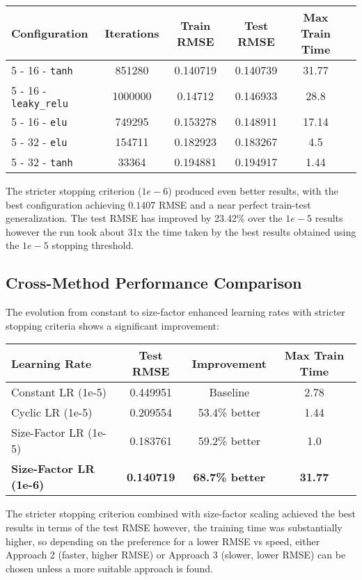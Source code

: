 \documentclass{article}
\begin{document}
\begin{center}
\begin{tabular}{|l|c|c|c|c|c|}
\hline
Configuration & Iterations & Train RMSE & Test RMSE & Max Train Time \\
\hline
5 - 16 - \verb|tanh| & 851280 & 0.140719 & 0.140739 & 31.77 \\
5 - 16 - \verb|leaky_relu| & 1000000 & 0.14712 & 0.146933 & 28.8 \\
5 - 16 - \verb|elu| & 749295 & 0.153278 & 0.148911 & 17.14 \\
5 - 32 - \verb|elu| & 154711 & 0.182923 & 0.183267 & 4.5 \\
5 - 32 - \verb|tanh| & 33364 & 0.194881 & 0.194917 & 1.44 \\
\hline
\end{tabular}
\end{center}

The stricter stopping criterion ($1e-6$) produced even better results, with the best configuration achieving $0.1407$ RMSE and a near perfect train-test generalization. The test RMSE has improved by 23.42\% over the $1e-5$ results however the run took about 31x the time taken by the best results obtained using the $1e-5$ stopping threshold.

\subsection{Cross-Method Performance Comparison}
The evolution from constant to size-factor enhanced learning rates with stricter stopping criteria shows a significant improvement:

\begin{center}
\begin{tabular}{|l|c|c|c|}
\hline
Learning Rate & Test RMSE & Improvement & Max Train Time\\
\hline
Constant LR (1e-5) & 0.449951 & Baseline & 2.78 \\
Cyclic LR (1e-5) & 0.209554 & 53.4\% better & 1.44 \\
Size-Factor LR (1e-5) & 0.183761 & 59.2\% better & 1.0 \\
\textbf{Size-Factor LR (1e-6)} & \textbf{0.140719} & \textbf{68.7\% better} & \textbf{31.77} \\
\hline
\end{tabular}
\end{center}

The stricter stopping criterion combined with size-factor scaling achieved the best results in terms of the test RMSE however, the training time was substantially higher, so depending on the preference for a lower RMSE vs speed, either Approach 2 (faster, higher RMSE) or Approach 3 (slower, lower RMSE) can be chosen unless a more suitable approach is found.
\end{document}
